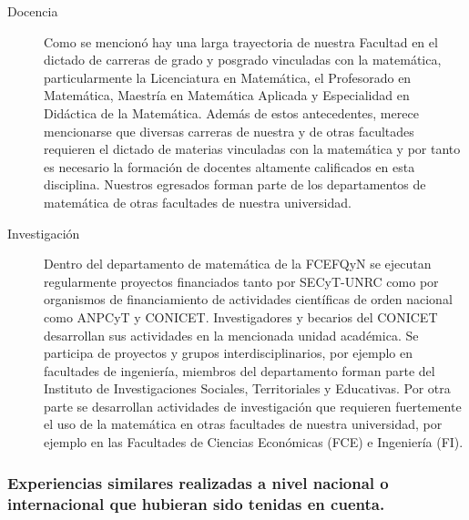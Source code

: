 \documentclass[a4paper, 12pt]{article}
\begin{document}
\begin{description}
 \item[Docencia] Como se mencionó hay una larga trayectoria  de nuestra Facultad en el dictado de carreras de grado y posgrado  vinculadas con la matemática, particularmente la Licenciatura en Matemática, el Profesorado en Matemática, Maestría en Matemática Aplicada y Especialidad en Didáctica de la Matemática. Además de estos antecedentes, merece mencionarse que diversas carreras de nuestra y de otras facultades requieren el dictado de materias vinculadas con la matemática y por tanto es necesario la formación de docentes altamente calificados en esta disciplina. Nuestros egresados forman parte de los departamentos de matemática de otras facultades de nuestra universidad.
 
 \item[Investigación] Dentro del departamento de matemática de la FCEFQyN se ejecutan regularmente  proyectos financiados tanto por SECyT-UNRC como por organismos de financiamiento de actividades científicas de orden  nacional como ANPCyT y CONICET. Investigadores y becarios del CONICET desarrollan sus actividades en la mencionada unidad académica. Se participa de proyectos y grupos interdisciplinarios, por ejemplo en  facultades de ingeniería, miembros del departamento forman parte  del Instituto de Investigaciones Sociales, Territoriales y  Educativas. Por otra parte se desarrollan actividades de investigación que requieren fuertemente el uso de la matemática en otras facultades de nuestra universidad, por ejemplo en las Facultades de Ciencias Económicas (FCE) e Ingeniería (FI).
 

 
 
\end{description}






\subsubsection{Experiencias similares realizadas a nivel nacional o internacional que hubieran sido tenidas en cuenta.}
\end{document}
